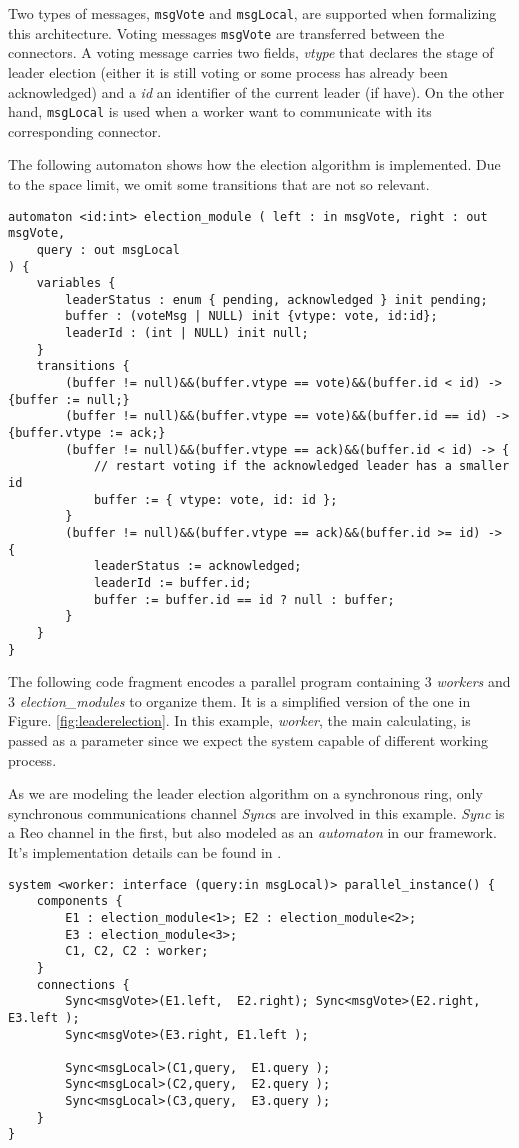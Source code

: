 Two types of messages, \texttt{msgVote} and \texttt{msgLocal}, are supported when formalizing this architecture. Voting messages \texttt{msgVote} are transferred between the connectors. A voting message carries two fields, \emph{vtype} that declares the stage of leader election (either it is still voting or some process has already been acknowledged) and a \emph{id} an identifier of the current leader (if have). On the other hand, \texttt{msgLocal} is used when a worker want to communicate with its corresponding connector.
\begin{example} The following automaton shows how the election algorithm is implemented. Due to the space limit, we omit some transitions that are not so relevant.
\begin{lstlisting}[basicstyle=\scriptsize\ttfamily]
automaton <id:int> election_module ( left : in msgVote, right : out msgVote,
	query : out msgLocal
) {
	variables {
		leaderStatus : enum { pending, acknowledged } init pending;
		buffer : (voteMsg | NULL) init {vtype: vote, id:id};
		leaderId : (int | NULL) init null;
	}
	transitions {
		(buffer != null)&&(buffer.vtype == vote)&&(buffer.id < id) -> {buffer := null;}
		(buffer != null)&&(buffer.vtype == vote)&&(buffer.id == id) -> {buffer.vtype := ack;}
		(buffer != null)&&(buffer.vtype == ack)&&(buffer.id < id) -> {
			// restart voting if the acknowledged leader has a smaller id
			buffer := { vtype: vote, id: id };
		}
		(buffer != null)&&(buffer.vtype == ack)&&(buffer.id >= id) -> {
			leaderStatus := acknowledged;
			leaderId := buffer.id;
			buffer := buffer.id == id ? null : buffer;
		}
	}
}
\end{lstlisting}
\end{example}


The following code fragment encodes a parallel program containing 3 \emph{workers} and 3 \emph{election\_modules} to organize them. It is a simplified version of the one in Figure. \ref{fig:leaderelection}. In this example, \emph{worker}, the main calculating, is passed as a parameter since we expect the system capable of different working process.

As we are modeling the leader election algorithm on a synchronous ring, only synchronous communications channel \emph{Sync}s are involved in this example. \emph{Sync} is a Reo channel in the first, but also modeled as an \emph{automaton} in our framework. It's implementation details can be found in  \cite{medmodels}.

\begin{example}
\begin{lstlisting}[basicstyle=\scriptsize\ttfamily]
system <worker: interface (query:in msgLocal)> parallel_instance() {
	components {
		E1 : election_module<1>; E2 : election_module<2>;
		E3 : election_module<3>;
		C1, C2, C2 : worker;
	}	
	connections {
		Sync<msgVote>(E1.left,	E2.right); Sync<msgVote>(E2.right, E3.left );
		Sync<msgVote>(E3.right,	E1.left );
		
		Sync<msgLocal>(C1,query,  E1.query );
		Sync<msgLocal>(C2,query,  E2.query );
		Sync<msgLocal>(C3,query,  E3.query );
	}
}
\end{lstlisting}
\label{exp:clustersystem}
\end{example}